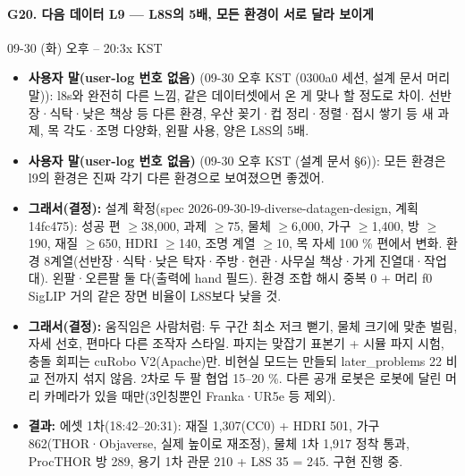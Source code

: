 \paragraph{G20. 다음 데이터 L9 --- L8S의 5배, 모든 환경이 서로 달라 보이게}
{\small 09-30 (화) 오후 -- 20:3x KST}
\begin{itemize}
  \item \textbf{사용자 말(user-log 번호 없음)} (09-30 오후 KST (0300a0 세션, 설계 문서 머리말)): l8s와 완전히 다른 느낌, 같은 데이터셋에서 온 게 맞나 할 정도로 차이. 선반장·식탁·낮은 책상 등 다른 환경, 우산 꽂기·컵 정리·정렬·접시 쌓기 등 새 과제, 목 각도·조명 다양화, 왼팔 사용, 양은 L8S의 5배.
  \item \textbf{사용자 말(user-log 번호 없음)} (09-30 오후 KST (설계 문서 §6)): 모든 환경은 l9의 환경은 진짜 각기 다른 환경으로 보여졌으면 좋겠어.
  \item \textbf{그래서(결정):} 설계 확정(spec 2026-09-30-l9-diverse-datagen-design, 계획 14fc475): 성공 편 $\geq$38,000, 과제 $\geq$75, 물체 $\geq$6,000, 가구 $\geq$1,400, 방 $\geq$190, 재질 $\geq$650, HDRI $\geq$140, 조명 계열 $\geq$10, 목 자세 100 \% 편에서 변화. 환경 8계열(선반장·식탁·낮은 탁자·주방·현관·사무실 책상·가게 진열대·작업대). 왼팔·오른팔 둘 다(출력에 hand 필드). 환경 조합 해시 중복 0 + 머리 f0 SigLIP 거의 같은 장면 비율이 L8S보다 낮을 것.
  \item \textbf{그래서(결정):} 움직임은 사람처럼: 두 구간 최소 저크 뻗기, 물체 크기에 맞춘 벌림, 자세 선호, 편마다 다른 조작자 스타일. 파지는 맞잡기 표본기 + 시뮬 파지 시험, 충돌 회피는 cuRobo V2(Apache)만. 비현실 모드는 만들되 later\_problems 22 비교 전까지 섞지 않음. 2차로 두 팔 협업 15--20 \%. 다른 공개 로봇은 로봇에 달린 머리 카메라가 있을 때만(3인칭뿐인 Franka·UR5e 등 제외).
  \item \textbf{결과:} 에셋 1차(18:42--20:31): 재질 1,307(CC0) + HDRI 501, 가구 862(THOR·Objaverse, 실제 높이로 재조정), 물체 1차 1,917 정착 통과, ProcTHOR 방 289, 용기 1차 관문 210 + L8S 35 = 245. 구현 진행 중.
\end{itemize}


